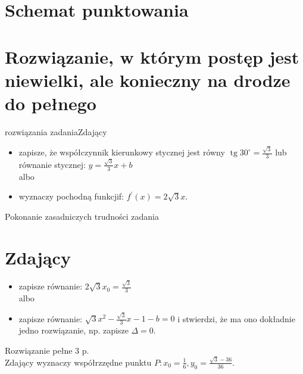 \documentclass[10pt]{article}
\begin{document}
\section*{Schemat punktowania}
\section*{Rozwiązanie, w którym postęp jest niewielki, ale konieczny na drodze do pełnego}
 rozwiązania zadaniaZdający

\begin{itemize}
  \item zapisze, że współczynnik kierunkowy stycznej jest równy $\operatorname{tg} 30^{\circ}=\frac{\sqrt{3}}{3}$ lub równanie stycznej: $y=\frac{\sqrt{3}}{3} x+b$\\
albo
  \item wyznaczy pochodną funkcjif: $f^{\prime}(x)=2 \sqrt{3} x$.
\end{itemize}

Pokonanie zasadniczych trudności zadania

\section*{Zdający}
\begin{itemize}
  \item zapisze równanie: $2 \sqrt{3} x_{0}=\frac{\sqrt{3}}{3}$\\
albo
  \item zapisze równanie: $\sqrt{3} x^{2}-\frac{\sqrt{3}}{3} x-1-b=0$ i stwierdzi, że ma ono dokładnie jedno rozwiązanie, np. zapisze $\Delta=0$.
\end{itemize}

Rozwiązanie pełne 3 p.\\
Zdający wyznaczy współrzzędne punktu $P: x_{0}=\frac{1}{6}, y_{0}=\frac{\sqrt{3}-36}{36}$.
\end{document}
